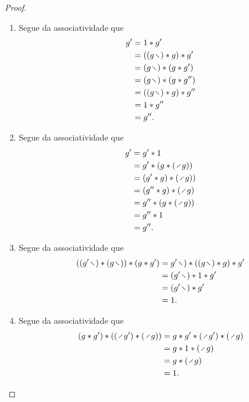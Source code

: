 \begin{proof}
	\begin{enumerate}
	\item Segue da associatividade que
		\begin{align*}
		g' &= 1 \opb g' \\
			&= ((g \vid) \opb g) \opb g' \\
			&= (g \vid) \opb (g \opb g') \\
			&= (g \vid) \opb (g \opb g'') \\
			&= ((g \vid) \opb g) \opb g'' \\
			&= 1 \opb g'' \\
			&= g''.
		\end{align*}
	\item Segue da associatividade que
		\begin{align*}
		g' &= g' \opb 1 \\
			&= g' \opb (g \opb (\div g)) \\
			&= (g' \opb g) \opb (\div g)) \\
			&= (g'' \opb g) \opb (\div g) \\
			&= g'' \opb (g \opb (\div g)) \\
			&= g'' \opb 1 \\
			&= g''.
		\end{align*}
	\item Segue da associatividade que
		\begin{align*}
		((g' \vid) \opb (g \vid)) \opb (g \opb g') &= g' \vid) \opb ((g \vid) \opb g) \opb g' \\
			&= (g' \vid) \opb 1 \opb g' \\
			&= (g' \vid) \opb g' \\
			&= 1.
		\end{align*}
	\item Segue da associatividade que
		\begin{align*}
		(g \opb g') \opb ((\div g') \opb (\div g)) &= g \opb g' \opb (\div g') \opb (\div g) \\
			&= g \opb 1 \opb (\div g) \\
			&= g \opb (\div g) \\
			&= 1.
		\end{align*}
	\end{enumerate}
\end{proof}

